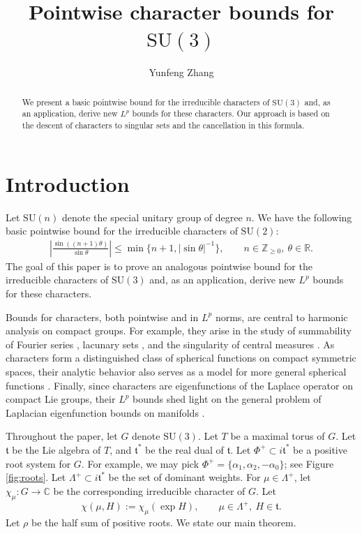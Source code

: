\documentclass{amsart}
\title[Pointwise character bounds for $\mathrm{SU}(3)$]{Pointwise character bounds for $\mathrm{SU}(3)$}
\author[Y. Zhang]{Yunfeng Zhang}
\numberwithin{equation}{section}
\newcommand{\R}[0]{\mathbb{R}}
\numberwithin{equation}{section}
\begin{document}
\begin{abstract}
We present a basic pointwise bound for the irreducible characters of $\mathrm{SU}(3)$ and, as an application, derive new $L^p$ bounds for these characters. Our approach is based on the descent of characters to singular sets and the cancellation in this formula. 
\end{abstract}


\maketitle


\section{Introduction}
Let $\mathrm{SU}(n)$ denote the special unitary group of degree $n$. 
We have the following basic pointwise bound for the irreducible characters of $\mathrm{SU}(2)$:
\begin{align}\label{eq: rank one}
    \left|\frac{\sin ((n+1)\theta)}{\sin \theta}\right|\leq\min\{n+1,|\sin\theta|^{-1}\},\qquad n\in\mathbb{Z}_{\geq 0}, \ \theta\in\R.
\end{align}
The goal of this paper is to prove an analogous pointwise bound for the irreducible characters of $\mathrm{SU}(3)$ and, as an application, derive new $L^p$ bounds for these characters.

Bounds for characters, both pointwise and in $L^p$ norms, are central to harmonic analysis on compact groups. For example, they arise in the study of summability of Fourier series \cite{Cle76, ST78, GST82, Giu83}, lacunary sets \cite{Cec72, Doo79, Giu83}, and the singularity of central measures \cite{Har98, HWY00}. As characters form a distinguished class of spherical functions on compact symmetric spaces, their analytic behavior also serves as a model for more general spherical functions \cite{Cle88, Mar16}. Finally, since characters are eigenfunctions of the Laplace operator on compact Lie groups, their $L^p$ bounds shed light on the general problem of Laplacian eigenfunction bounds on manifolds \cite{Sog88, Zel17}.



Throughout the paper, let $G$ denote $\mathrm{SU}(3)$. Let $T$ be a maximal torus of $G$. Let $\mathfrak{t}$ be the Lie algebra of $T$, and $\mathfrak{t}^*$ be the real dual of $\mathfrak{t}$. Let $\Phi^+\subset i\mathfrak{t}^*$ be a positive root system for $G$. 
For example, we may pick $\Phi^+=\{\alpha_1,\alpha_2,-\alpha_0\}$; see Figure \ref{fig:roots}. Let $\Lambda^+\subset i\mathfrak{t}^*$ be the set of dominant weights. For $\mu\in\Lambda^+$, let $\chi_\mu:G\to\mathbb{C}$ be the corresponding irreducible character of $G$. 
Let
$$\chi(\mu,H):=\chi_\mu(\exp H),\qquad \mu\in\Lambda^+,\ H\in\mathfrak{t}.$$
Let $\rho$ be the half sum of positive roots. We state our main theorem. 
\end{document}
